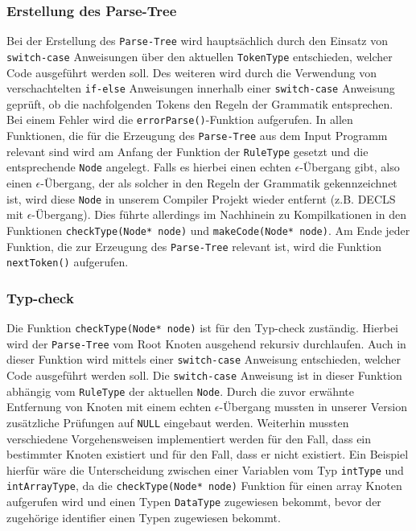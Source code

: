 \documentclass[
a4paper,   %
11pt,      %
oneside,   %
onecolumn, %
final      %
]{article}
\newcommand{\code}[1]{\lstinline$#1$}
\begin{document}
\subsubsection{Erstellung des Parse-Tree}
Bei der Erstellung des \code{Parse-Tree} wird hauptsächlich durch den Einsatz von \code{switch-case}
Anweisungen über den aktuellen \code{TokenType} entschieden, welcher Code ausgeführt werden soll. Des weiteren wird durch die Verwendung von verschachtelten \code{if-else} Anweisungen innerhalb einer \code{switch-case} Anweisung geprüft, ob die nachfolgenden Tokens den Regeln der Grammatik entsprechen. Bei einem Fehler wird die \code{errorParse()}-Funktion aufgerufen. In allen Funktionen, die für die Erzeugung des \code{Parse-Tree} aus dem Input Programm relevant sind wird am Anfang der Funktion der \code{RuleType} gesetzt und die entsprechende \code{Node} angelegt. Falls es hierbei einen echten $\epsilon$-Übergang gibt, also einen $\epsilon$-Übergang, der als solcher in den Regeln der Grammatik gekennzeichnet ist, wird diese \code{Node} in unserem Compiler Projekt wieder entfernt (z.B. DECLS mit $\epsilon$-Übergang). Dies führte allerdings im Nachhinein zu Kompilkationen in den Funktionen \code{checkType(Node* node)} und \code{makeCode(Node* node)}. Am Ende jeder Funktion, die zur Erzeugung des \code{Parse-Tree} relevant ist, wird die Funktion \code{nextToken()} aufgerufen.

\subsubsection{Typ-check}
Die Funktion \code{checkType(Node* node)} ist für den Typ-check zuständig. Hierbei wird der \code{Parse-Tree} vom Root Knoten ausgehend rekursiv durchlaufen. Auch in dieser Funktion wird mittels einer \code{switch-case} Anweisung entschieden, welcher Code ausgeführt werden soll. Die \code{switch-case} Anweisung ist in dieser Funktion abhängig vom \code{RuleType} der aktuellen \code{Node}.
Durch die zuvor erwähnte Entfernung von Knoten mit einem echten $\epsilon$-Übergang mussten in unserer Version zusätzliche Prüfungen auf \code{NULL} eingebaut werden. Weiterhin mussten verschiedene Vorgehensweisen implementiert werden für den Fall, dass ein bestimmter Knoten existiert und für den Fall, dass er nicht existiert. Ein Beispiel hierfür wäre die Unterscheidung zwischen einer Variablen vom Typ \code{intType} und \code{intArrayType}, da die \code{checkType(Node* node)} Funktion für einen array Knoten aufgerufen wird und einen 
\newline
Typen \code{DataType} zugewiesen bekommt, bevor der zugehörige identifier einen Typen zugewiesen bekommt.
\end{document}
